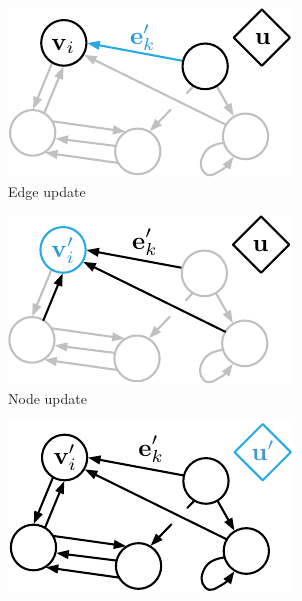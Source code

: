 \begin{figure}[t]
\centering
\hfill
\begin{subfigure}[b]{0.30\textwidth}
    \includegraphics[width=\textwidth]{figures/edge_update}
    \caption{Edge update}
\end{subfigure}
\hfill
\begin{subfigure}[b]{0.30\textwidth}
    \includegraphics[width=\textwidth]{figures/node_update}
    \caption{Node update}
\end{subfigure}
\hfill
\begin{subfigure}[b]{0.30\textwidth}
    \includegraphics[width=\textwidth]{figures/global_update}

\end{subfigure}
\end{figure}
